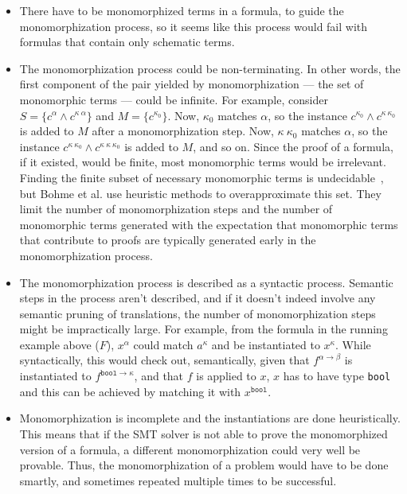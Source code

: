 \documentclass{article}
\begin{document}
	\begin{itemize}
		\item There have to be monomorphized 
		terms in a formula, to guide the 
		monomorphization process, so it 
		seems like this process would 
		fail with formulas that contain 
		only schematic terms. 
		\item The monomorphization process 
		could be non-terminating. In 
		other words, the first component
		of the pair yielded by 
		monomorphization --- the 
		set of monomorphic terms ---
		could be infinite. For example,
		consider $S = \{c^{\alpha}
		\land c^{\kappa\ \alpha}\}$
		and $M = \{c^{\kappa_0}\}$.
		Now, $\kappa_0$ matches 
		$\alpha$, so the instance
		$c^{\kappa_0} \land 
		c^{\kappa\ \kappa_0}$ is added 
		to $M$ after a monomorphization 
		step. Now, $\kappa\ \kappa_0$
		matches $\alpha$, so the 
		instance $c^{\kappa\ \kappa_0} 
		\land c^{\kappa\ \kappa\ 
			\kappa_0}$ is added to $M$, 
		and so on. Since the proof of a 
		formula, if it existed, would 
		be finite, most monomorphic 
		terms would be irrelevant. 
		Finding the finite subset of 
		necessary monomorphic terms is 
		undecidable~\cite{10.1007/978-3-642-24364-6_7},
		but Bohme et al. use heuristic
		methods to overapproximate
		this set. They limit the 
		number of monomorphization 
		steps and the number of 
		monomorphic terms generated
		with the expectation that 
		monomorphic terms that 
		contribute to proofs 
		are typically generated early 
		in the monomorphization process.
		\item The monomorphization process
		is described as a syntactic 
		process. Semantic steps in 
		the process aren't described, 
		and if it doesn't indeed 
		involve	any semantic pruning of 
		translations, the number of 
		monomorphization steps 
		might be impractically large. 
		For example, from the formula 
		in the running example above ($F$), 
		$x^{\alpha}$ could match 
		$a^{\kappa}$ and be instantiated 
		to $x^{\kappa}$. While 
		syntactically, this would 
		check out, semantically, 
		given that $f^{\alpha \to \beta}$
		is instantiated to 
		$f^{\texttt{bool} \to \kappa}$, 
		and that $f$ is applied to $x$, 
		$x$ has to have type 
		\texttt{bool} and this can be 
		achieved by matching it with 
		$x^{\texttt{bool}}$.
		\item Monomorphization is 
		incomplete and the instantiations 
		are done heuristically. This 
		means that if the SMT solver 
		is not able to prove the 
		monomorphized version of a 
		formula, a different 
		monomorphization could 
		very well be provable. Thus, 
		the monomorphization of a 
		problem would have to be 
		done smartly, and sometimes
		repeated multiple times to 
		be successful. 
	\end{itemize} 
	
\end{document}
